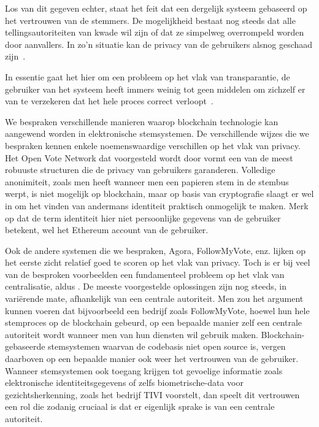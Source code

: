 		Los van dit gegeven echter, staat het feit dat een dergelijk systeem gebaseerd op het vertrouwen van de stemmers. De mogelijkheid bestaat nog steeds dat alle tellingsautoriteiten van kwade wil zijn of dat ze simpelweg overrompeld worden door aanvallers. In zo’n situatie kan de privacy van de gebruikers alsnog geschaad zijn~\autocite{McCorry2017}.
		
		In essentie gaat het hier om een probleem op het vlak van transparantie, de gebruiker van het systeem heeft immers weinig tot geen middelen om zichzelf er van te verzekeren dat het hele proces correct verloopt~\autocite{McCorry2017}. 
		
		We bespraken verschillende manieren waarop blockchain technologie kan aangewend worden in elektronische stemsystemen. De verschillende wijzes die we bespraken kennen enkele noemenswaardige verschillen op het vlak van privacy. Het Open Vote Network dat voorgesteld wordt door \textcite{McCorry2017} vormt een van de meest robuuste structuren die de privacy van gebruikers garanderen. Volledige anonimiteit, zoals men heeft wanneer men een papieren stem in de stembus werpt, is niet mogelijk op blockchain, maar op basis van cryptografie slaagt \textcite{McCorry2017} er wel in om het vinden van andermans identiteit praktisch onmogelijk te maken. Merk op dat  de term identiteit hier niet persoonlijke gegevens van de gebruiker betekent, wel het Ethereum account van de gebruiker.
		
		Ook  de andere systemen die we bespraken, Agora, FollowMyVote, enz. lijken op het eerste zicht relatief goed te scoren op het vlak van privacy. Toch is er bij veel van de besproken voorbeelden een fundamenteel probleem op het vlak van centralisatie, aldus \textcite{McCorry2017}. De meeste voorgestelde oplossingen zijn nog steeds, in variërende mate, afhankelijk van een centrale autoriteit. Men zou het argument kunnen voeren dat bijvoorbeeld een bedrijf zoals FollowMyVote, hoewel hun hele stemproces op de blockchain gebeurd, op een bepaalde manier zelf een centrale autoriteit wordt wanneer men van hun diensten wil gebruik maken. Blockchain-gebaseerde stemsystemen waarvan de codebasis  niet open source is, vergen daarboven op een bepaalde manier ook weer het vertrouwen van de gebruiker. Wanneer stemsystemen ook toegang krijgen tot gevoelige informatie zoals elektronische identiteitsgegevens of zelfs biometrische-data voor gezichtsherkenning, zoals het bedrijf TIVI voorstelt, dan speelt dit vertrouwen een rol die zodanig cruciaal is dat er eigenlijk sprake is van een centrale autoriteit.
